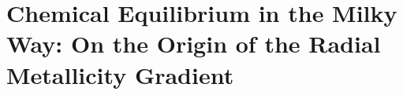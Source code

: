 \documentclass[main.tex]{subfiles}
\begin{document}
\chapter{Chemical Equilibrium in the Milky Way: On the Origin of the Radial
Metallicity Gradient}
\label{outflows}

\begin{doublespace}


% 


\end{doublespace}
\end{document}
